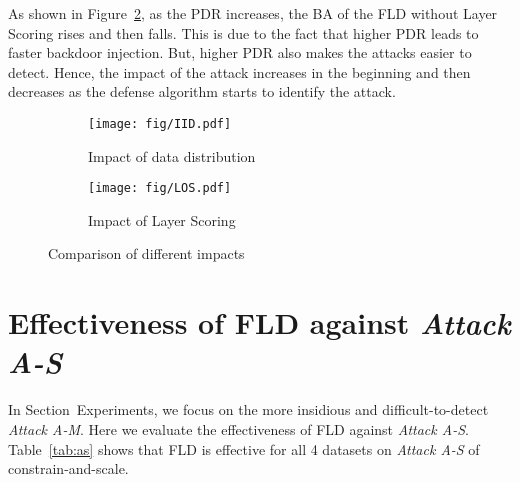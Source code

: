 As shown in Figure~\ref{fig:Layer Scoring}, as the PDR increases, the BA of the FLD without Layer Scoring rises and then falls. This is due to the fact that higher PDR leads to faster backdoor injection. But, higher PDR also makes the attacks easier to detect. Hence, the impact of the attack increases in the beginning and then decreases as the defense algorithm starts to identify the attack.

\begin{figure}[htbp]
  \centering
  \begin{subfigure}[b]{0.49\linewidth}
    \centering
    \texttt{[image: fig/IID.pdf]}
    \caption{Impact of  data distribution}
    \label{fig:alpha}
  \end{subfigure}
  \hfill
  \begin{subfigure}[b]{0.49\linewidth}
    \centering
    \texttt{[image: fig/LOS.pdf]}
    \caption{Impact of Layer Scoring}
    \label{fig:Layer Scoring}
  \end{subfigure}
  \caption{Comparison of different impacts}
  \label{fig:comparison}
\end{figure}


\section{Effectiveness of FLD against \textit{Attack A-S} }
In Section~Experiments, we focus on the more insidious and difficult-to-detect \textit{Attack A-M}. Here we evaluate the effectiveness of FLD against \textit{Attack A-S}. Table~\ref{tab:as} shows that FLD is effective for all 4 datasets on \textit{Attack A-S} of constrain-and-scale. 

